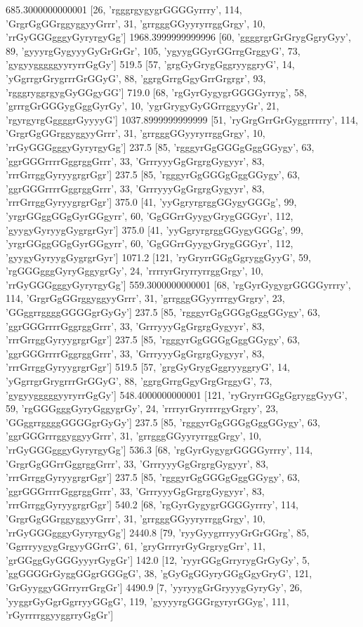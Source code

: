 685.3000000000001 [26, 'rgggrgygygrGGGGyrrry', 114, 'GrgrGgGGrggyggyyGrrr', 31, 'grrgggGGyyryrrggGrgy', 10, 'rrGyGGGgggyGyryrgyGg']
1968.3999999999996 [60, 'ggggrgrGrGrygGgryGyy', 89, 'gyyyrgGygyyyGyGrGrGr', 105, 'ygyygGGyrGGrrgGrggyG', 73, 'gygyygggggyyryrrGgGy']
519.5 [57, 'grgGyGrygGggryyggryG', 14, 'yGgrrgrGrygrrrGrGGyG', 88, 'ggrgGrrgGgyGrrGrgrgr', 93, 'rgggryggrgygGyGGgyGG']
719.0 [68, 'rgGyrGygygrGGGGyrryg', 58, 'grrrgGrGGGygGggGyrGy', 10, 'ygrGrygyGyGGrrggyyGr', 21, 'rgyrgyrgGggggrGyyyyG']
1037.8999999999999 [51, 'ryGrgGrrGrGyggrrrrry', 114, 'GrgrGgGGrggyggyyGrrr', 31, 'grrgggGGyyryrrggGrgy', 10, 'rrGyGGGgggyGyryrgyGg']
237.5 [85, 'rgggyrGgGGGgGggGGygy', 63, 'ggrGGGrrrrGggrggGrrr', 33, 'GrrryyyGgGrgrgGygyyr', 83, 'rrrGrrggGyryygrgrGgr']
237.5 [85, 'rgggyrGgGGGgGggGGygy', 63, 'ggrGGGrrrrGggrggGrrr', 33, 'GrrryyyGgGrgrgGygyyr', 83, 'rrrGrrggGyryygrgrGgr']
375.0 [41, 'yyGgryrgrggGGygyGGGg', 99, 'yrgrGGggGGgGyrGGgyrr', 60, 'GgGGrrGyygyGrygGGGyr', 112, 'gyygyGyryygGygrgrGyr']
375.0 [41, 'yyGgryrgrggGGygyGGGg', 99, 'yrgrGGggGGgGyrGGgyrr', 60, 'GgGGrrGyygyGrygGGGyr', 112, 'gyygyGyryygGygrgrGyr']
1071.2 [121, 'ryGryrrGGgGgryggGyyG', 59, 'rgGGGgggGyryGggygrGy', 24, 'rrrryrGryrryrrggGrgy', 10, 'rrGyGGGgggyGyryrgyGg']
559.3000000000001 [68, 'rgGyrGygygrGGGGyrrry', 114, 'GrgrGgGGrggyggyyGrrr', 31, 'grrgggGGyyrrrgyGrgry', 23, 'GGggrrggggGGGGgrGyGy']
237.5 [85, 'rgggyrGgGGGgGggGGygy', 63, 'ggrGGGrrrrGggrggGrrr', 33, 'GrrryyyGgGrgrgGygyyr', 83, 'rrrGrrggGyryygrgrGgr']
237.5 [85, 'rgggyrGgGGGgGggGGygy', 63, 'ggrGGGrrrrGggrggGrrr', 33, 'GrrryyyGgGrgrgGygyyr', 83, 'rrrGrrggGyryygrgrGgr']
519.5 [57, 'grgGyGrygGggryyggryG', 14, 'yGgrrgrGrygrrrGrGGyG', 88, 'ggrgGrrgGgyGrgGrggyG', 73, 'gygyygggggyyryrrGgGy']
548.4000000000001 [121, 'ryGryrrGGgGgryggGyyG', 59, 'rgGGGgggGyryGggygrGy', 24, 'rrrryrGryrrrrgyGrgry', 23, 'GGggrrggggGGGGgrGyGy']
237.5 [85, 'rgggyrGgGGGgGggGGygy', 63, 'ggrGGGrrrggyggyyGrrr', 31, 'grrgggGGyyryrrggGrgy', 10, 'rrGyGGGgggyGyryrgyGg']
536.3 [68, 'rgGyrGygygrGGGGyrrry', 114, 'GrgrGgGGrrGggrggGrrr', 33, 'GrrryyyGgGrgrgGygyyr', 83, 'rrrGrrggGyryygrgrGgr']
237.5 [85, 'rgggyrGgGGGgGggGGygy', 63, 'ggrGGGrrrrGggrggGrrr', 33, 'GrrryyyGgGrgrgGygyyr', 83, 'rrrGrrggGyryygrgrGgr']
540.2 [68, 'rgGyrGygygrGGGGyrrry', 114, 'GrgrGgGGrggyggyyGrrr', 31, 'grrgggGGyyryrrggGrgy', 10, 'rrGyGGGgggyGyryrgyGg']
2440.8 [79, 'ryyGyygrrryyGrGrGGrg', 85, 'GgrrryygygGrgyyGGrrG', 61, 'gryGrrryrGyGrgrygGrr', 11, 'grGGggGyGGGyyyrGygGr']
142.0 [12, 'ryyrGGgGrryrygGrGyGy', 5, 'ggGGGGrGyggGGgrGGGgG', 38, 'gGyGgGGyryGGgGgyGryG', 121, 'GrGyyggyGGrryrrGrgGr']
4490.9 [7, 'yyryygGrGryyygGyryGy', 26, 'yyggrGyGgrGgrryyGGgG', 119, 'gyyyyrgGGGrgyryrGGyg', 111, 'rGyrrrrggyyggrryGgGr']
